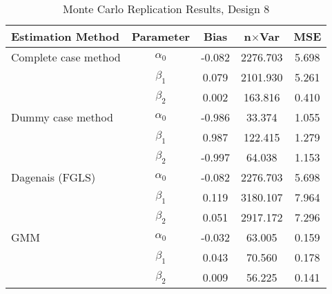 \begin{table}
\centering
\caption{Monte Carlo Replication Results, Design 8}
\label{table:MCReplicationResultsDesign8}
\begin{tabular}{lcccc}
\toprule
Estimation Method & Parameter & Bias & n$\times$Var & MSE \\
\midrule
Complete case method & $\alpha_0$ & -0.082 & 2276.703 & 5.698 \\
 & $\beta_1$ & 0.079 & 2101.930 & 5.261 \\
 & $\beta_2$ & 0.002 & 163.816 & 0.410 \\
Dummy case method & $\alpha_0$ & -0.986 & 33.374 & 1.055 \\
 & $\beta_1$ & 0.987 & 122.415 & 1.279 \\
 & $\beta_2$ & -0.997 & 64.038 & 1.153 \\
Dagenais (FGLS) & $\alpha_0$ & -0.082 & 2276.703 & 5.698 \\
 & $\beta_1$ & 0.119 & 3180.107 & 7.964 \\
 & $\beta_2$ & 0.051 & 2917.172 & 7.296 \\
GMM & $\alpha_0$ & -0.032 & 63.005 & 0.159 \\
 & $\beta_1$ & 0.043 & 70.560 & 0.178 \\
 & $\beta_2$ & 0.009 & 56.225 & 0.141 \\
\bottomrule
\end{tabular}
\end{table}
